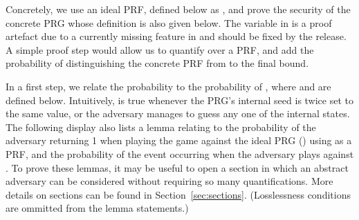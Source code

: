 Concretely, we use an ideal PRF, defined below as , and prove the
security of the concrete PRG  whose definition is also given below.
The  variable in  is a proof artefact due to a currently missing
feature in \EasyCrypt and should be fixed by the release. A simple proof step
would allow us to quantify over a PRF, and add the probability of distinguishing
the concrete PRF from  to the final bound.


In a first step, we relate the probability 
to the probability of ,
where  and  are defined below. Intuitively, 
is true whenever the PRG's internal seed is twice set to the same value, or
the adversary manages to guess any one of the internal states. The following
display also lists a lemma relating 
to the probability of the adversary returning 1 when playing the  game
against the ideal PRG () using  as
a PRF, and the probability 
of the  event occurring when the adversary plays against .
To prove these lemmas, it may be useful to open a section in which an abstract
adversary  can be considered without requiring so many quantifications.
More details on sections can be found in Section~\ref{sec:sections}.
(Losslessness conditions are ommitted from the lemma statements.)

